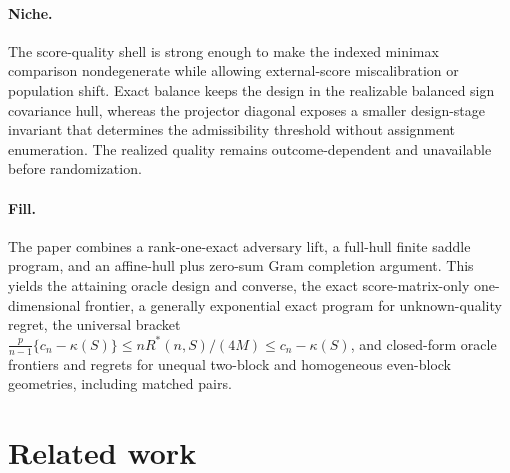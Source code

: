 \documentclass{article}
\begin{document}
\paragraph{Niche.} The score-quality shell is strong enough to make the indexed minimax comparison nondegenerate while allowing external-score miscalibration or population shift. Exact balance keeps the design in the realizable balanced sign covariance hull, whereas the projector diagonal exposes a smaller design-stage invariant that determines the admissibility threshold without assignment enumeration. The realized quality remains outcome-dependent and unavailable before randomization.

\paragraph{Fill.} The paper combines a rank-one-exact adversary lift, a full-hull finite saddle program, and an affine-hull plus zero-sum Gram completion argument. This yields the attaining oracle design and converse, the exact score-matrix-only one-dimensional frontier, a generally exponential exact program for unknown-quality regret, the universal bracket \(\frac{p}{n-1}\{c_n-\kappa(S)\}\leq nR^*(n,S)/(4M)\leq c_n-\kappa(S)\), and closed-form oracle frontiers and regrets for unequal two-block and homogeneous even-block geometries, including matched pairs.

\section{Related work}
\end{document}
